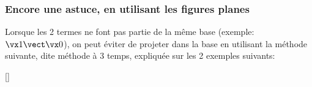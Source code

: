 \documentclass[11pt]{article}
\begin{document}
\subsubsection{Encore une astuce, en utilisant les figures planes}
Lorsque les 2 termes ne font pas partie de la même base (exemple: $\vx1\vect\vx0$), on peut éviter de projeter  dans la base  en utilisant la méthode suivante, dite \og méthode à 3 temps\fg{}, expliquée sur les 2 exemples suivants:

\vspace{-1em}
\begin{center}
  []

\end{center}
\end{document}
